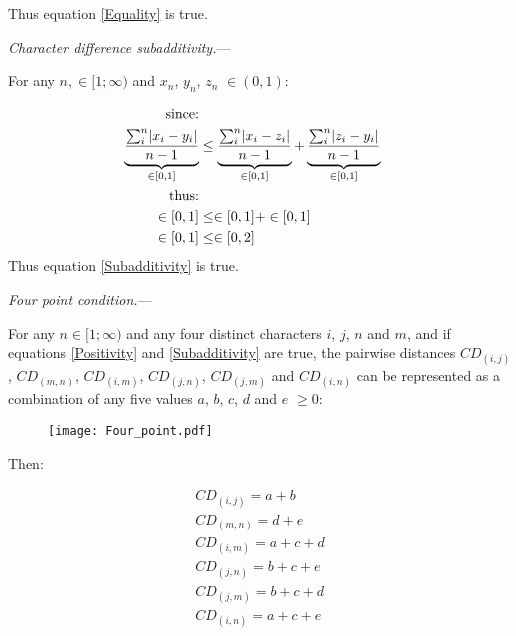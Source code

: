\documentclass[12pt,letterpaper]{article}
\DeclarePairedDelimiter\abs{\lvert}{\rvert}%
\renewcommand{\subsection}[1]{%
\bigskip
\begin{center}
\begin{large}
\normalfont\itshape #1
\end{large}
\end{center}}
\renewcommand{\subsection}[1]{%
\vspace{2ex}
\noindent
\textit{#1.}---}
\begin{document}
Thus equation \ref{Equality} is true.

\subsection{Character difference subadditivity}

For any $n, \in [1;\infty)$ and $x_{n}$, $y_{n}$, $z_{n}$ $\in (0,1)$:

\begin{equation}
    \label{equality_demo}
    \begin{aligned}
    \text{since:}\\
    \underbrace{\frac{\sum_{i}^{n}\abs{x_{i}-y_{i}}}{n-1}}_{\in[0,1]}
    &\leq
    \underbrace{\frac{\sum_{i}^{n}\abs{x_{i}-z_{i}}}{n-1}}_{\in[0,1]}
    +
    \underbrace{\frac{\sum_{i}^{n}\abs{z_{i}-y_{i}}}{n-1}}_{\in[0,1]}\\
    \text{thus:}\\
    \in[0,1] &\leq \in[0,1] + \in[0,1] \\
    \in[0,1] &\leq \in[0,2]\\
    \end{aligned}
\end{equation}
Thus equation \ref{Subadditivity} is true.


\newpage

\subsection{Four point condition}

For any $n \in [1;\infty)$ and any four distinct characters $i$, $j$, $n$ and $m$, and if equations \ref{Positivity} and \ref{Subadditivity} are true, the pairwise distances $CD_{(i,j)}$, $CD_{(m,n)}$, $CD_{(i,m)}$, $CD_{(j,n)}$, $CD_{(j,m)}$ and $CD_{(i,n)}$ can be represented as a combination of any five values $a$, $b$, $c$, $d$ and $e$ $\geq 0$:

\begin{figure}[!htbp]
\centering
   \texttt{[image: Four\_point.pdf]}
\end{figure}

Then:

\begin{equation}
    \begin{aligned}
    CD_{(i,j)} = a + b \\
    CD_{(m,n)} = d + e \\
    CD_{(i,m)} = a + c + d \\
    CD_{(j,n)} = b + c + e \\
    CD_{(j,m)} = b + c + d \\
    CD_{(i,n)} = a + c + e \\
    \end{aligned}
\end{equation}
\end{document}
